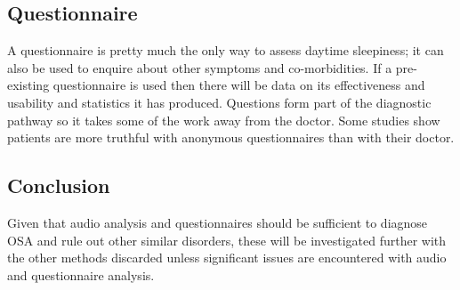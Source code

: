 \subsection{Questionnaire}
A questionnaire is pretty much the only way to assess daytime sleepiness; it can also be used to enquire about other symptoms and co-morbidities. If a pre-existing questionnaire is used then there will be data on its effectiveness and usability and statistics it has produced. Questions form part of the diagnostic pathway so it takes some of the work away from the doctor. Some studies show patients are more truthful with anonymous questionnaires than with their doctor. 

\subsection{Conclusion}
Given that audio analysis and questionnaires should be sufficient to diagnose OSA and rule out other similar disorders, these will be investigated further with the other methods discarded unless significant issues are encountered with audio and questionnaire analysis. 
